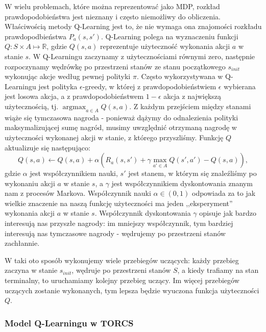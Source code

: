 \documentclass{article}
\DeclareMathOperator{\argmax}{argmax}
\begin{document}
W wielu problemach, które można reprezentować jako MDP, rozkład prawdopodobieństwa jest nieznany i często niemożliwy do obliczenia. Właściwością metody Q-Learning jest to, że nie wymaga ona znajomości rozkładu prawdopodbieństwa $P_a(s,s')$. Q-Learning polega na wyznaczeniu funkcji $Q : S \times A \mapsto \mathbb{R}$, gdzie $Q(s,a)$ reprezentuje użyteczność wykonania akcji $a$ w stanie $s$. W Q-Learningu zaczynamy z użytecznościami równymi zero, następnie rozpoczynamy wędrówkę po przestrzeni stanów ze stanu początkowego $s_{init}$ wykonując akcje według pewnej polityki $\pi$. Często wykorzystywana w Q-Learningu jest polityka $\epsilon$-greedy, w której z prawdopodobieństwiem $\epsilon$ wybierana jest losowa akcja, a z prawdopodobieństwem $1 - \epsilon$ akcja z największą użytecznością, tj. $\argmax_{a \in A} Q(s, a)$. Z każdym przejściem między stanami wiąże się tymczasowa nagroda - ponieważ dążymy do odnalezienia polityki maksymalizującej sumę nagród, musimy uwzględnić otrzymaną nagrodę w użyteczności wykonanej akcji w stanie, z którego przyszliśmy. Funkcję $Q$ aktualizuje się następująco:
\begin{equation}
Q(s,a) \leftarrow Q(s,a) + \alpha(R_a(s,s') + \gamma \max_{a' \in A} Q(s',a') - Q(s,a)) ,
\end{equation}
gdzie $\alpha$ jest współczynnikiem nauki, $s'$ jest stanem, w którym się znaleźliśmy po wykonaniu akcji $a$ w stanie $s$, a $\gamma$ jest współczynnikiem dyskontowania znanym nam z procesów Markova. Współczynnik nauki $\alpha \in (0,1)$ odpowiada za to jak wielkie znaczenie na naszą funkcję użyteczności ma jeden ,,eksperyment'' wykonania akcji $a$ w stanie $s$. Współczynnik dyskontowania $\gamma$ opisuje jak bardzo interesują nas przyszłe nagrody: im mniejszy współczynnik, tym bardziej interesują nas tymczasowe nagrody - wędrujemy po przestrzeni stanów zachłannie.

W taki oto sposób wykonujemy wiele przebiegów uczących: każdy przebieg zaczyna w stanie $s_{init}$, wędruje po przestrzeni stanów $S$, a kiedy trafiamy na stan terminalny, to uruchamiamy kolejny przebieg uczący. Im więcej przebiegów uczących zostanie wykonanych, tym lepsza będzie wyuczona funkcja użyteczności $Q$.

\subsubsection{Model Q-Learningu w TORCS}
\end{document}
